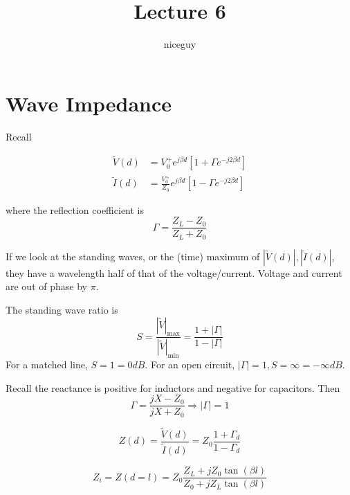 \documentclass[12pt]{article}
\title{Lecture 6}
\author{niceguy}
\begin{document}
\maketitle

\section{Wave Impedance}

Recall

\begin{align*}
    \tilde V(d) &= V_0^+ e^{j\beta d}[1 + \Gamma e^{-j2\beta d}] \\
    \tilde I(d) &= \frac{V_0^+}{Z_0} e^{j\beta d}[1 - \Gamma e^{-j2\beta d}]
\end{align*}

where the reflection coefficient is
$$\Gamma = \frac{Z_L - Z_0}{Z_L + Z_0}$$

If we look at the standing waves, or the (time) maximum of $|\tilde V(d)|, |\tilde I(d)|$, they have a wavelength half of that of the voltage/current. Voltage and current are out of phase by $\pi$.

\begin{defn}
    The standing wave ratio is
    $$S = \frac{|\tilde V|_\text{max}}{|\tilde V|_\text{min}} = \frac{1 + |\Gamma|}{1 - |\Gamma|}$$
    For a matched line, $S = 1 = 0\unit{dB}$. For an open circuit, $|\Gamma| = 1, S = \infty = -\infty \unit{dB}$.
\end{defn}

Recall the reactance is positive for inductors and negative for capacitors. Then
$$\Gamma = \frac{jX - Z_0}{jX + Z_0} \Rightarrow |\Gamma| = 1$$

\begin{defn}
    $$Z(d) = \frac{\tilde V(d)}{\tilde I(d)} = Z_0 \frac{1 + \Gamma_d}{1 - \Gamma_d}$$
\end{defn}

\begin{defn}
    $$Z_i = Z(d=l) = Z_0 \frac{Z_L + jZ_0\tan(\beta l)}{Z_0 + jZ_L\tan(\beta l)}$$
\end{defn}
\end{document}
